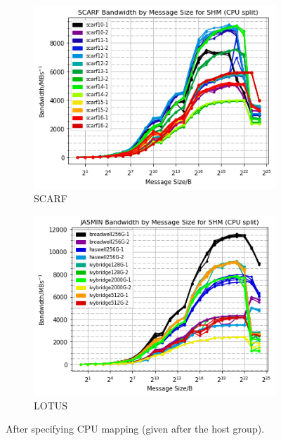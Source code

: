 \documentclass{article}
\begin{document}
            \begin{figure}[H]
                \centering
                \begin{subfigure}{.5\textwidth}
                  \centering
                  \includegraphics[width=\textwidth]{scarf_bandwidth-msgsize_shm_split}
                  \caption{SCARF}
                \end{subfigure}%
                \begin{subfigure}{.5\textwidth}
                  \centering
                  \includegraphics[width=\textwidth]{jasmin_bandwidth-msgsize_shm_split}
                  \caption{LOTUS}
                \end{subfigure}
            \caption{After specifying CPU mapping (given after the host group).}
            \label{figure:imb-after-cpus}
            \end{figure}
\end{document}
